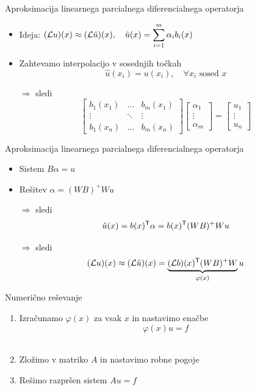 \begin{frame}{Aproksimacija linearnega parcialnega diferencialnega operatorja}
  \begin{itemize}
    \item Ideja: \hfill $(\mathcal{L} u)(x) \approx (\mathcal{L} \hat{u})(x), \quad \displaystyle \hat{u}(x) = \sum_{i=1}^m
      \alpha_i b_i(x)$ \hfill \mbox{ } \\[2ex]
    \item  Zahtevamo interpolacijo v sosednjih točkah
      \[ \hat{u}(x_i) = u(x_i), \quad \forall x_i \text{ sosed } x \] \pause
    \item[$\Rightarrow$] sledi
      \[
        \begin{bmatrix}
        b_1(x_1) & \ldots & b_m(x_1) \\
        \vdots & \ddots & \vdots \\
        b_1(x_n) & \ldots & b_m(x_n)
        \end{bmatrix}
        \begin{bmatrix}
        \alpha_1 \\ \vdots \\ \alpha_m
        \end{bmatrix}
        =
        \begin{bmatrix}
        u_1 \\ \vdots \\ u_n
        \end{bmatrix}
      \]
  \end{itemize}
\end{frame}
\begin{frame}{Aproksimacija linearnega parcialnega diferencialnega operatorja}
  \begin{itemize}
    \item Sistem $B\alpha = u$ \\[2ex]
    \item Rešitev $\alpha =  (WB)^+W u$\\[2ex] \pause
    \item[$\Rightarrow$] sledi
    \[
      \hat{u}(x) = b(x)^{\mathsf{T}}\alpha = b(x)^{\mathsf{T}}(WB)^+W u
    \]  \pause \vspace{-2ex}
    \item[$\Rightarrow$] sledi
      \[ (\mathcal{L} u)(x) \approx (\mathcal{L} \hat{u})(x) = \underbrace{(\mathcal{L} b)(x)^{\mathsf{T}} (WB)^+W}_{\varphi(x)} u \]
  \end{itemize}
\end{frame}

\begin{frame}{Numerično reševanje}
  \begin{enumerate}
    \item Izračunamo $\varphi(x)$ za vsak $x$ in nastavimo enačbe \[ \varphi(x)u = f \] \\[4ex]
    \item Zložimo v matriko $A$ in nastavimo robne pogoje\\[10ex]
    \item Rešimo razpršen sistem $Au = f$
  \end{enumerate}
\end{frame}

